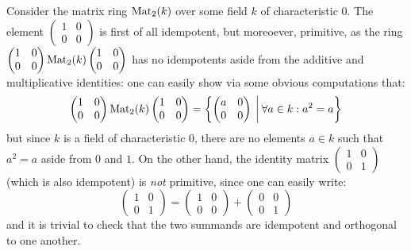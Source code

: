             \begin{example}
                Consider the matrix ring $\mathrm{Mat}_2(k)$ over some field $k$ of characteristic $0$. The element $\begin{pmatrix} 1 & 0 \\ 0 & 0 \end{pmatrix}$ is first of all idempotent, but moreoever, primitive, as the ring $\begin{pmatrix} 1 & 0 \\ 0 & 0 \end{pmatrix} \mathrm{Mat}_2(k) \begin{pmatrix} 1 & 0 \\ 0 & 0 \end{pmatrix}$ has no idempotents aside from the additive and multiplicative identities: one can easily show via some obvious computations that:
                    $$\begin{pmatrix} 1 & 0 \\ 0 & 0 \end{pmatrix} \mathrm{Mat}_2(k) \begin{pmatrix} 1 & 0 \\ 0 & 0 \end{pmatrix} = \left\{ \begin{pmatrix} a & 0 \\ 0 & 0 \end{pmatrix} \: \bigg| \: \forall a \in k: a^2 = a\right\}$$
                but since $k$ is a field of characteristic $0$, there are no elements $a \in k$ such that $a^2 = a$ aside from $0$ and $1$. On the other hand, the identity matrix $\begin{pmatrix} 1 & 0 \\ 0 & 1 \end{pmatrix}$ (which is also idempotent) is \textit{not} primitive, since one can easily write:
                    $$\begin{pmatrix} 1 & 0 \\ 0 & 1 \end{pmatrix} = \begin{pmatrix} 1 & 0 \\ 0 & 0 \end{pmatrix} + \begin{pmatrix} 0 & 0 \\ 0 & 1 \end{pmatrix}$$
                and it is trivial to check that the two summands are idempotent and orthogonal to one another.
            \end{example}
            \begin{remark} \label{remark: idempotents_split}
                
            \end{remark}
